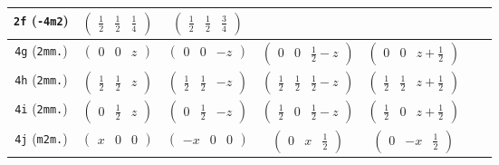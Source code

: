 \documentclass[fleqn,9pt,landscape]{jsarticle}
\begin{document}
\begin{center}
\begin{longtable}{ccccccc}
{\tt 2f} ({\tt -4m2}) & $ \begin{pmatrix} \frac{1}{2} & \frac{1}{2} & \frac{1}{4} \end{pmatrix} $ & $ \begin{pmatrix} \frac{1}{2} & \frac{1}{2} & \frac{3}{4} \end{pmatrix} $ & $  $ & $  $ & $  $ & $  $ \\ \hline
{\tt 4g} ({\tt 2mm.}) & $ \begin{pmatrix} 0 & 0 & z \end{pmatrix} $ & $ \begin{pmatrix} 0 & 0 & - z \end{pmatrix} $ & $ \begin{pmatrix} 0 & 0 & \frac{1}{2} - z \end{pmatrix} $ & $ \begin{pmatrix} 0 & 0 & z + \frac{1}{2} \end{pmatrix} $ & $  $ & $  $ \\ \hline
{\tt 4h} ({\tt 2mm.}) & $ \begin{pmatrix} \frac{1}{2} & \frac{1}{2} & z \end{pmatrix} $ & $ \begin{pmatrix} \frac{1}{2} & \frac{1}{2} & - z \end{pmatrix} $ & $ \begin{pmatrix} \frac{1}{2} & \frac{1}{2} & \frac{1}{2} - z \end{pmatrix} $ & $ \begin{pmatrix} \frac{1}{2} & \frac{1}{2} & z + \frac{1}{2} \end{pmatrix} $ & $  $ & $  $ \\ \hline
{\tt 4i} ({\tt 2mm.}) & $ \begin{pmatrix} 0 & \frac{1}{2} & z \end{pmatrix} $ & $ \begin{pmatrix} 0 & \frac{1}{2} & - z \end{pmatrix} $ & $ \begin{pmatrix} \frac{1}{2} & 0 & \frac{1}{2} - z \end{pmatrix} $ & $ \begin{pmatrix} \frac{1}{2} & 0 & z + \frac{1}{2} \end{pmatrix} $ & $  $ & $  $ \\ \hline
{\tt 4j} ({\tt m2m.}) & $ \begin{pmatrix} x & 0 & 0 \end{pmatrix} $ & $ \begin{pmatrix} - x & 0 & 0 \end{pmatrix} $ & $ \begin{pmatrix} 0 & x & \frac{1}{2} \end{pmatrix} $ & $ \begin{pmatrix} 0 & - x & \frac{1}{2} \end{pmatrix} $ & $  $ & $  $ \\ \hline

\end{longtable}
\end{center}
\end{document}
